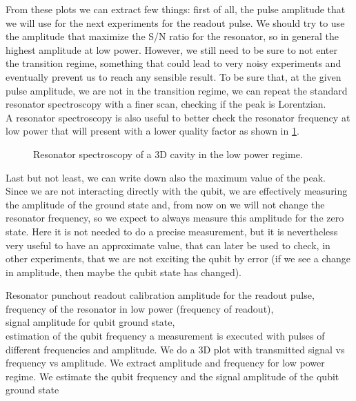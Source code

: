 From these plots we can extract few things: first of all, the pulse  amplitude that we will use for the next experiments for the readout pulse.
We should try to use the amplitude that maximize the S/N ratio for the resonator, so in general the highest amplitude at low power.
However, we still need to be sure to not enter the transition regime, something that could lead to very noisy experiments and eventually prevent us to reach any sensible result.
To be sure that, at the given pulse amplitude, we are not in the transition regime, we can repeat the standard resonator spectroscopy with a finer scan, checking if the peak is Lorentzian.\\
A resonator spectroscopy is also useful to better check the resonator frequency at low power that will present with a lower quality factor as shown in \cref{fig:resonator_spectroscopy_after_punchout}.

\begin{figure}[ht]
    \caption{Resonator spectroscopy of a 3D cavity in the low power regime.}
    \label{fig:resonator_spectroscopy_after_punchout}
\end{figure}

Last but not least, we can write down also the maximum value of the peak.\\
Since we are not interacting directly with the qubit, we are effectively measuring the amplitude of the ground state and, from now on we will not change the resonator frequency, so we expect to always measure this amplitude for the zero state.
Here it is not needed to do a precise measurement, but it is nevertheless very useful to have an approximate value, that can later be used to check, in other experiments, that we are not exciting the qubit by error (if we see a change in amplitude, then maybe the qubit state has changed).

\experimentrecap
{Resonator punchout}
{readout calibration}
{amplitude for the readout pulse,\\frequency of the resonator in low power (frequency of readout),\\signal amplitude for qubit ground state,\\estimation of the qubit frequency}
{a measurement is executed with pulses of different frequencies and amplitude. We do a 3D plot with transmitted signal vs frequency vs amplitude. We extract amplitude and frequency for low power regime. We estimate the qubit frequency and the signal amplitude of the qubit ground state}